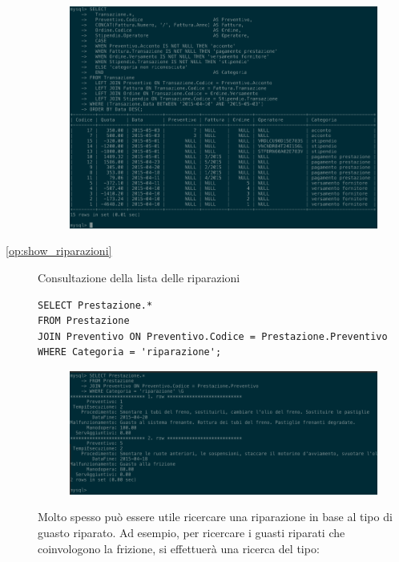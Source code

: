 \begin{description}
              \begin{figure}[H]
                \centering
                \includegraphics[width=12cm]{images/screenshots/show_transazioni.png}
              \end{figure}

            \item[\ref{op:show_riparazioni}] Consultazione della lista delle riparazioni

              \begin{lstlisting}
SELECT Prestazione.*
FROM Prestazione
JOIN Preventivo ON Preventivo.Codice = Prestazione.Preventivo
WHERE Categoria = 'riparazione';
              \end{lstlisting}

              \begin{figure}[H]
                \centering
                \includegraphics[width=12cm]{images/screenshots/list_riparazioni.png}
              \end{figure}

              Molto spesso può essere utile ricercare una riparazione in base al tipo di guasto riparato. Ad esempio, per ricercare i guasti riparati che coinvologono la frizione, si effettuerà una ricerca del tipo:


\end{description}
